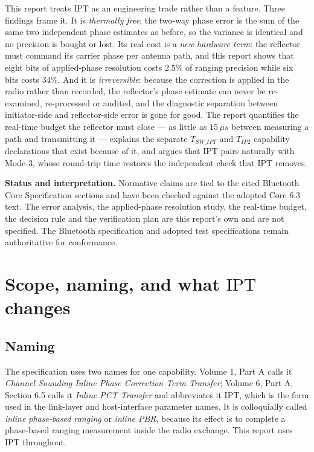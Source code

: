 \documentclass[11pt,a4paper]{article}
\newcommand{\us}{\,\ensuremath{\upmu}s}
\newcommand{\IPT}{\ensuremath{\mathrm{IPT}}}
\newcommand{\Tswipt}{T_{SW\_IPT}}
\newcommand{\Tiptwo}{T_{IP2}}
\providecommand{\upmu}{\mu}
\begin{document}
This report treats \IPT{} as an engineering trade rather than a feature. Three findings frame it.
It is \emph{thermally free}: the two-way phase error is the sum of the same two independent phase
estimates as before, so the variance is identical and no precision is bought or lost. Its real cost
is a \emph{new hardware term}: the reflector must command its carrier phase per antenna path, and
this report shows that eight bits of applied-phase resolution costs $2.5\%$ of ranging precision
while six bits costs $34\%$. And it is \emph{irreversible}: because the correction is applied in the
radio rather than recorded, the reflector's phase estimate can never be re-examined, re-processed or
audited, and the diagnostic separation between initiator-side and reflector-side error is gone for
good. The report quantifies the real-time budget the reflector must close --- as little as $15\us$
between measuring a path and transmitting it --- explains the separate $\Tswipt$ and
$\Tiptwo$ capability declarations that exist because of it, and argues that \IPT{} pairs naturally
with Mode-3, whose round-trip time restores the independent check that \IPT{} removes.

\begin{callout}
\textbf{Status and interpretation.} Normative claims are tied to the cited Bluetooth Core
Specification sections and have been checked against the adopted Core 6.3 text. The error analysis,
the applied-phase resolution study, the real-time budget, the decision rule and the verification plan
are this report's own and are not specified. The Bluetooth specification and adopted test
specifications remain authoritative for conformance.
\end{callout}

\newpage
\tableofcontents
\newpage
{}
\setcounter{page}{1}

\section{Scope, naming, and what \IPT{} changes}

\subsection{Naming}

The specification uses two names for one capability. Volume 1, Part A calls it \emph{Channel Sounding
Inline Phase Correction Term Transfer}; Volume 6, Part A, Section 6.5 calls it \emph{Inline PCT
Transfer} and abbreviates it \IPT, which is the form used in the link-layer and host-interface
parameter names. It is colloquially called \emph{inline phase-based ranging} or \emph{inline PBR},
because its effect is to complete a phase-based ranging measurement inside the radio exchange. This
report uses \IPT{} throughout.
\end{document}
